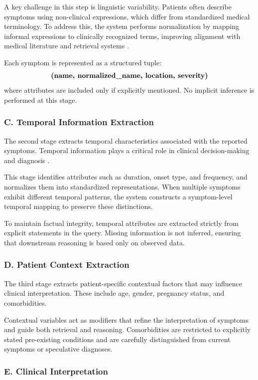 \documentclass[conference, anonymous]{IEEEtran}
\begin{document}
A key challenge in this step is linguistic variability. Patients often describe symptoms using non-clinical expressions, which differ from standardized medical terminology. To address this, the system performs normalization by mapping informal expressions to clinically recognized terms, improving alignment with medical literature and retrieval systems \cite{devlin2019bert}.

Each symptom is represented as a structured tuple:
\[
\textbf{(\text{name},\ \text{normalized\_name},\ \text{location},\ \text{severity})}
\]
where attributes are included only if explicitly mentioned. No implicit inference is performed at this stage.

\subsubsection{C. Temporal Information Extraction}

The second stage extracts temporal characteristics associated with the reported symptoms. Temporal information plays a critical role in clinical decision-making and diagnosis \cite{rajkomar2018}.

This stage identifies attributes such as duration, onset type, and frequency, and normalizes them into standardized representations. When multiple symptoms exhibit different temporal patterns, the system constructs a symptom-level temporal mapping to preserve these distinctions.

To maintain factual integrity, temporal attributes are extracted strictly from explicit statements in the query. Missing information is not inferred, ensuring that downstream reasoning is based only on observed data.

\subsubsection{D. Patient Context Extraction}

The third stage extracts patient-specific contextual factors that may influence clinical interpretation. These include age, gender, pregnancy status, and comorbidities.

Contextual variables act as modifiers that refine the interpretation of symptoms and guide both retrieval and reasoning. Comorbidities are restricted to explicitly stated pre-existing conditions and are carefully distinguished from current symptoms or speculative diagnoses.

\subsubsection{E. Clinical Interpretation}
\end{document}
